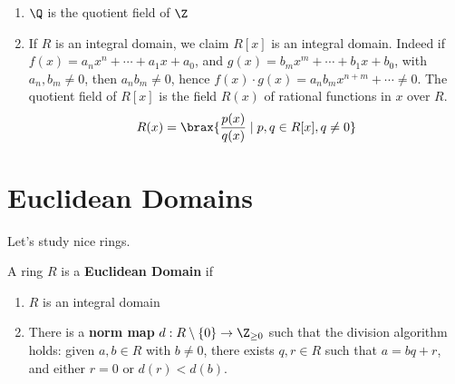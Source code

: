 \begin{ex}
    \begin{enumerate}
        \item $\Q$ is the quotient field of $\Z$
        \item If $R$ is an integral domain, we claim $R[x]$ is an integral domain. Indeed if $f(x) = a_nx^n+\cdots +a_1x+a_0$, and $g(x)=b_mx^m+\cdots +b_1x+b_0$, with $a_n,b_m \neq 0$, then $a_nb_m \neq 0$, hence $f(x) \cdot g(x)= a_nb_mx^{n+m}+\cdots \neq 0$. The quotient field of $R[x]$ is the field $R(x)$ of rational functions in $x$ over $R$.
        $$R(x) = \brax{\frac{p(x)}{q(x)} \mid p,q \in R[x], q \neq 0}$$
    \end{enumerate}
\end{ex}

\section{Euclidean Domains}

Let's study nice rings.

\begin{defn}
    A ring $R$ is a \textbf{Euclidean Domain} if
    \begin{enumerate}
        \item[(i)] $R$ is an integral domain
        \item[(ii)] There is a \textbf{norm map} $d:R\setminus \{0\} \to \Z_{\geq0 }$ such that the division algorithm holds: given $a,b \in R$ with $b \neq 0$, there exists $q,r \in R$ such that $a=bq+r$, and either $r=0$ or $d(r) < d(b)$.
    \end{enumerate}
\end{defn}


